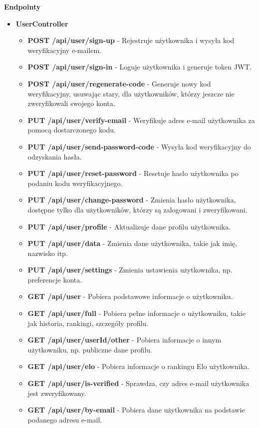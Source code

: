 \documentclass[12pt,a4paper]{article}
\begin{document}
\textbf{Endpointy}
\begin{itemize}
    \item \textbf{UserController}
    \begin{itemize} 
        \item \textbf{POST /api/user/sign-up} - Rejestruje użytkownika i wysyła kod weryfikacyjny e-mailem. 
        \item \textbf{POST /api/user/sign-in} - Loguje użytkownika i generuje token JWT. 
        \item \textbf{POST /api/user/regenerate-code} - Generuje nowy kod weryfikacyjny, usuwając stary, dla użytkowników, którzy jeszcze nie zweryfikowali swojego konta. 
        \item \textbf{PUT /api/user/verify-email} - Weryfikuje adres e-mail użytkownika za pomocą dostarczonego kodu. 
        \item \textbf{PUT /api/user/send-password-code} - Wysyła kod weryfikacyjny do odzyskania hasła. 
        \item \textbf{PUT /api/user/reset-password} - Resetuje hasło użytkownika po podaniu kodu weryfikacyjnego. 
        \item \textbf{PUT /api/user/change-password} - Zmienia hasło użytkownika, dostępne tylko dla użytkowników, którzy są zalogowani i zweryfikowani. 
        \item \textbf{PUT /api/user/profile} - Aktualizuje dane profilu użytkownika. 
        \item \textbf{PUT /api/user/data} - Zmienia dane użytkownika, takie jak imię, nazwisko itp. 
        \item \textbf{PUT /api/user/settings} - Zmienia ustawienia użytkownika, np. preferencje konta. 
        \item \textbf{GET /api/user} - Pobiera podstawowe informacje o użytkowniku. 
        \item \textbf{GET /api/user/full} - Pobiera pełne informacje o użytkowniku, takie jak historia, rankingi, szczegóły profilu. 
        \item \textbf{GET /api/user/{userId}/other} - Pobiera informacje o innym użytkowniku, np. publiczne dane profilu. 
        \item \textbf{GET /api/user/elo} - Pobiera informacje o rankingu Elo użytkownika. 
        \item \textbf{GET /api/user/is-verified} - Sprawdza, czy adres e-mail użytkownika jest zweryfikowany. 
        \item \textbf{GET /api/user/by-email} - Pobiera dane użytkownika na podstawie podanego adresu e-mail. 

\end{itemize}
\end{itemize}
\end{document}
